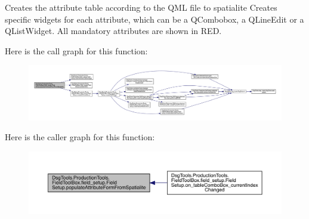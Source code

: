 \begin{DoxyVerb}Creates the attribute table according to the QML file to spatialite
Creates specific widgets for each attribute, which can be a QCombobox, a QLineEdit or a QListWidget.
All mandatory attributes are shown in RED.
\end{DoxyVerb}
 Here is the call graph for this function\+:
\nopagebreak
\begin{figure}[H]
\begin{center}
\leavevmode
\includegraphics[width=350pt]{class_dsg_tools_1_1_production_tools_1_1_field_tool_box_1_1field__setup_1_1_field_setup_a9c08a3099b5652afb71904d52b9c7d48_cgraph}
\end{center}
\end{figure}
Here is the caller graph for this function\+:
\nopagebreak
\begin{figure}[H]
\begin{center}
\leavevmode
\includegraphics[width=350pt]{class_dsg_tools_1_1_production_tools_1_1_field_tool_box_1_1field__setup_1_1_field_setup_a9c08a3099b5652afb71904d52b9c7d48_icgraph}
\end{center}
\end{figure}
\mbox{\label{class_dsg_tools_1_1_production_tools_1_1_field_tool_box_1_1field__setup_1_1_field_setup_a3f4f3e1bb22836cfb817c95336854602}} 
